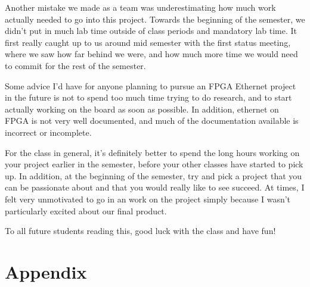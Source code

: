 \documentclass[12pt]{report}
\begin{document}
Another mistake we made as a team was underestimating how much work actually needed to go into this project. Towards the beginning of the semester, we didn't put in much lab time outside of class periods and mandatory lab time. It first really caught up to us around mid semester with the first status meeting, where we saw how far behind we were, and how much more time we would need to commit for the rest of the semester.

Some advice I'd have for anyone planning to pursue an FPGA Ethernet project in the future is not to spend too much time trying to do research, and to start actually working on the board as soon as possible. In addition, ethernet on FPGA is not very well documented, and much of the documentation available is incorrect or incomplete.

For the class in general, it's definitely better to spend the long hours working on your project earlier in the semester, before your other classes have started to pick up. In addition, at the beginning of the semester, try and pick a project that you can be passionate about and that you would really like to see succeed. At times, I felt very unmotivated to go in an work on the project simply because I wasn't particularly excited about our final product.

To all future students reading this, good luck with the class and have fun!

\printbibliography
\appendix
\chapter{Appendix}
\end{document}
